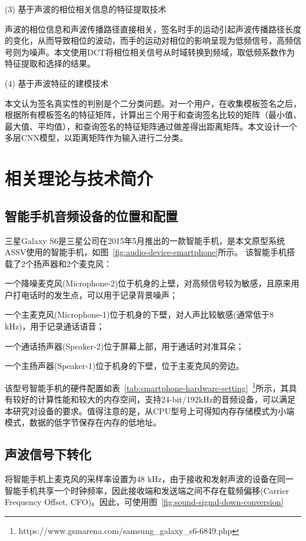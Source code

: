 (3) 基于声波的相位相关信息的特征提取技术

声波的相位信息和声波传播路径直接相关，签名时手的运动引起声波传播路径长度的变化，从而导致相位的波动，而手的运动对相位的影响呈现为低频信号，高频信号则为噪声。本文使用DCT将相位相关信号从时域转换到频域，取低频系数作为特征提取和选择的结果。

(4) 基于声波特征的建模技术

本文认为签名真实性的判别是个二分类问题。对一个用户，在收集模板签名之后，根据所有模板签名的特征矩阵，计算出三个用于和查询签名比较的矩阵（最小值、最大值、平均值），和查询签名的特征矩阵通过做差得出距离矩阵。本文设计一个多层CNN模型，以距离矩阵作为输入进行二分类。

\section{相关理论与技术简介}

\subsection{智能手机音频设备的位置和配置}

三星Galaxy S6是三星公司在2015年5月推出的一款智能手机，是本文原型系统ASSV使用的智能手机，如图~\ref{fig:audio-device-smartphone}所示。
该智能手机搭载了2个扬声器和2个麦克风：
\begin{enumerate*}[label=\alph*)]
    \item 一个降噪麦克风(Microphone-2)位于机身的上壁，对高频信号较为敏感，且原来用户打电话时的发生点，可以用于记录背景噪声；
    \item 一个主麦克风(Microphone-1)位于机身的下壁，对人声比较敏感(通常低于8 kHz)，用于记录通话语音；
    \item 一个通话扬声器(Speaker-2)位于屏幕上部，用于通话时对准耳朵；
    \item 一个主扬声器(Speaker-1)位于机身的下壁，位于主麦克风的旁边。
\end{enumerate*}

该型号智能手机的硬件配置如表~\ref{tab:smartphone-hardware-setting}~\footnote{https://www.gsmarena.com/samsung\_galaxy\_s6-6849.php}所示，其具有较好的计算性能和较大的内存空间，支持24-bit/192kHz的音频设备，可以满足本研究对设备的要求。值得注意的是，从CPU型号上可得知内存存储模式为小端模式，数据的低字节保存在内存的低地址。

\subsection{声波信号下转化}
将智能手机上麦克风的采样率设置为48 kHz，由于接收和发射声波的设备在同一智能手机共享一个时钟频率，因此接收端和发送端之间不存在载频偏移(Carrier Frequency Offset, CFO)。因此，可使用图~\ref{fig:sound-signal-down-conversion}

